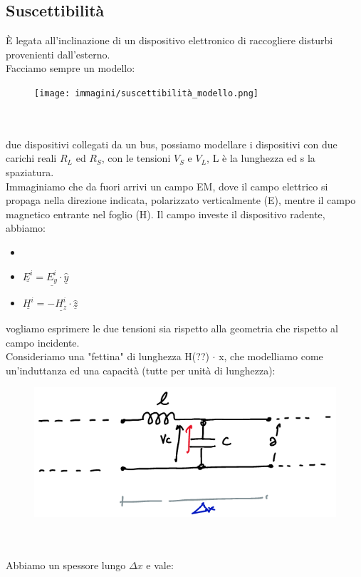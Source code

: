 \documentclass[oneside, 12pt]{extbook}
\begin{document}
\subsection{Suscettibilità}
È legata all'inclinazione di un dispositivo elettronico di raccogliere disturbi provenienti dall'esterno.\\Facciamo sempre un modello:\\
\begin{figure}[!h]
	\texttt{[image: immagini/suscettibilità\_modello.png]}
\end{figure}
\\\\due dispositivi collegati da un bus, possiamo modellare i dispositivi con due carichi reali $R_L$ ed $R_S$, con le tensioni $V_S$ e $V_L$, L è la lunghezza ed s la spaziatura.\\Immaginiamo che da fuori arrivi un campo EM, dove il campo elettrico si propaga nella direzione indicata, polarizzato verticalmente (E), mentre il campo magnetico entrante nel foglio (H). Il campo investe il dispositivo radente, abbiamo:
\begin{itemize}
	\item
	\item $\underline{E^i} = \underline{E_y^i} \cdot \underline{\hat{y}}$
	\item $\underline{H^i} = -\underline{H_z^i} \cdot \underline{\hat{z}}$
\end{itemize}
vogliamo esprimere le due tensioni sia rispetto alla geometria che rispetto al campo incidente.\\Consideriamo una "fettina" di lunghezza H(??) $\cdot$ x, che modelliamo come un'induttanza ed una capacità (tutte per unità di lunghezza):\\
\begin{figure}[!h]
	\includegraphics[scale=0.4]{immagini/suscett_schema.png}
\end{figure}
\\\\Abbiamo un spessore lungo $\Delta x$ e vale:
\end{document}

